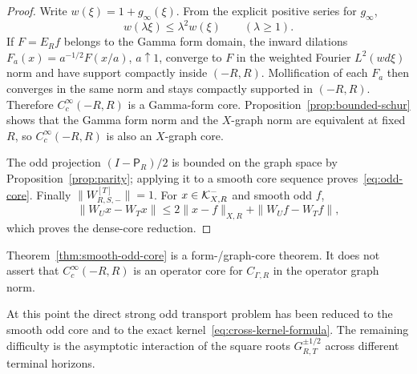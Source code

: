 \begin{proof}
Write $w(\xi)=1+g_\infty(\xi)$.  From the explicit positive series for $g_\infty$,
\[
 w(\lambda\xi)\le\lambda^2w(\xi)\qquad(\lambda\ge1).
\tag{DT.25}\label{eq:gamma-dilation}
\]
If $F=E_Rf$ belongs to the Gamma form domain, the inward dilations
$F_a(x)=a^{-1/2}F(x/a)$, $a\uparrow1$, converge to $F$ in the weighted Fourier
$L^2(wd\xi)$ norm and have support compactly inside $(-R,R)$.  Mollification of each
$F_a$ then converges in the same norm and stays compactly supported in $(-R,R)$.
Therefore $C_c^\infty(-R,R)$ is a Gamma-form core.  Proposition~\ref{prop:bounded-schur}
shows that the Gamma form norm and the $X$-graph norm are equivalent at fixed $R$, so
$C_c^\infty(-R,R)$ is also an $X$-graph core.

The odd projection $(I-\mathsf P_R)/2$ is bounded on the graph space by
Proposition~\ref{prop:parity}; applying it to a smooth core sequence proves~\eqref{eq:odd-core}.
Finally $\|W_{R,S,-}^{[T]}\|=1$.  For $x\in\mathcal K_{X,R}^-$ and smooth odd $f$,
\[
 \|W_Ux-W_Tx\|
 \le2\|x-f\|_{X,R}+\|W_Uf-W_Tf\|,
\]
which proves the dense-core reduction.
\end{proof}

\begin{remark}\label{rem:core-firewall}
Theorem~\ref{thm:smooth-odd-core} is a form-/graph-core theorem.  It does not assert
that $C_c^\infty(-R,R)$ is an operator core for $C_{\Gamma,R}$ in the operator graph
norm.
\end{remark}

At this point the direct strong odd transport problem has been reduced to the smooth odd
core and to the exact kernel~\eqref{eq:cross-kernel-formula}.  The remaining difficulty is the asymptotic
interaction of the square roots $G_{R,T}^{\pm1/2}$ across different terminal horizons.